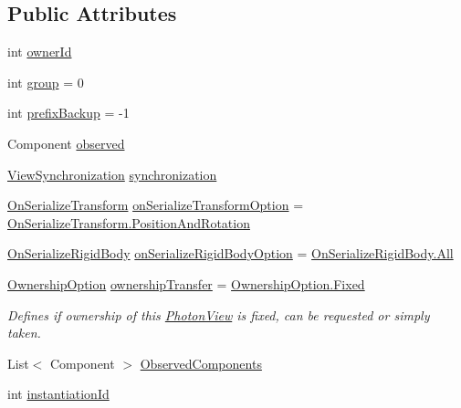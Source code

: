 \subsection*{Public Attributes}
\begin{DoxyCompactItemize}
\item 
int \hyperlink{class_photon_view_af37a856ac051d3882de691851c7d2d08}{owner\+Id}
\item 
int \hyperlink{class_photon_view_a9f8a7d9f0fa7703f07dcc2f0daf0e4db}{group} = 0
\item 
int \hyperlink{class_photon_view_a3a3650071e812aca9b9cd518638ebd7d}{prefix\+Backup} = -\/1
\item 
Component \hyperlink{class_photon_view_a7429864925f0716b072e8a7c4b23c59b}{observed}
\item 
\hyperlink{_photon_view_8cs_adca9c5e682d5417add581b004cd5b990}{View\+Synchronization} \hyperlink{class_photon_view_a634144e72774beb34d84c3ab7cac9cd4}{synchronization}
\item 
\hyperlink{_photon_view_8cs_a2188da6000e577148a984d5c78b279d2}{On\+Serialize\+Transform} \hyperlink{class_photon_view_a72f924cef0d24da2c542e80062cc3934}{on\+Serialize\+Transform\+Option} = \hyperlink{_photon_view_8cs_a2188da6000e577148a984d5c78b279d2aa2090ce6165d865de2f99434311550a2}{On\+Serialize\+Transform.\+Position\+And\+Rotation}
\item 
\hyperlink{_photon_view_8cs_a30dff10dfe67eb47ed952eac57dd6dc3}{On\+Serialize\+Rigid\+Body} \hyperlink{class_photon_view_a57eb2e5b6b3aea9e4ac6cc494dc19a27}{on\+Serialize\+Rigid\+Body\+Option} = \hyperlink{_photon_view_8cs_a30dff10dfe67eb47ed952eac57dd6dc3ab1c94ca2fbc3e78fc30069c8d0f01680}{On\+Serialize\+Rigid\+Body.\+All}
\item 
\hyperlink{_photon_view_8cs_afcc67b7812df847096e32bd0a953b39f}{Ownership\+Option} \hyperlink{class_photon_view_a29400fef2cf398230b2c63a7d66f6d9a}{ownership\+Transfer} = \hyperlink{_photon_view_8cs_afcc67b7812df847096e32bd0a953b39fa4457d440870ad6d42bab9082d9bf9b61}{Ownership\+Option.\+Fixed}
\begin{DoxyCompactList}\small\item\em Defines if ownership of this \hyperlink{class_photon_view}{Photon\+View} is fixed, can be requested or simply taken. \end{DoxyCompactList}\item 
List$<$ Component $>$ \hyperlink{class_photon_view_ae0c6ba75b4b849f41a2164c0ad7dbf8f}{Observed\+Components}
\item 
int \hyperlink{class_photon_view_aa32a59c1f2bd619673142ab75fc7c928}{instantiation\+Id}
\end{DoxyCompactItemize}
